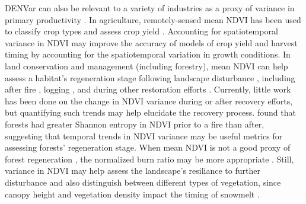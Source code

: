 \documentclass{article}
\begin{document}
DENVar can also be relevant to a variety of industries as a proxy of variance in primary productivity \citep{pettorelli_using_2005}. In agriculture, remotely-sensed mean NDVI has been used to classify crop types \citep{zhang_crop_2022, bhatti_field_2024} and assess crop yield \citep{roznik_improving_2022}. Accounting for spatiotemporal variance in NDVI may improve the accuracy of models of crop yield and harvest timing by accounting for the spatiotemporal variation in growth conditions. In land conservation and management (including forestry), mean NDVI can help assess a habitat's regeneration stage following landscape disturbance \citep{pickell_forest_2016}, including after fire \citep{lanorte_fishershannon_2014, valtonen_remotely_2021, zahabnazouri_detecting_2025}, logging \citep{chirici_monitoring_2020}, and during other restoration efforts \citep{valtonen_remotely_2021}. Currently, little work has been done on the change in NDVI variance during or after recovery efforts, but quantifying such trends may help elucidate the recovery process. \citet{lanorte_fishershannon_2014} found that forests had greater Shannon entropy \citep{shannon_mathematical_1948} in NDVI prior to a fire than after, suggesting that temporal trends in NDVI variance may be useful metrics for assessing forests' regeneration stage. When mean NDVI is not a good proxy of forest regeneration \citep[e.g., ][]{buma_evaluating_2012}, the normalized burn ratio may be more appropriate \citep{chen_detecting_2011}. Still, variance in NDVI may help assess the landscape's resiliance to further disturbance and also distinguish between different types of vegetation, since canopy height and vegetation density impact the timing of snowmelt \citep{sun_forest_2022}.


\end{document}
